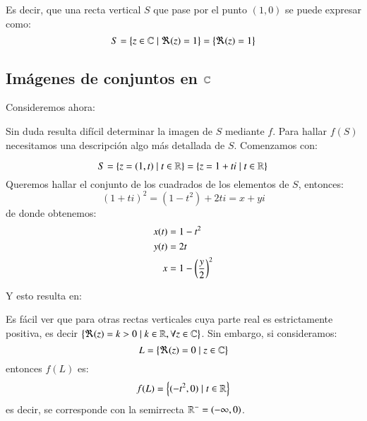     Es decir, que una recta vertical $S$ que pase por el punto $(1, 0)$ se puede expresar como:
    $$
        S = \left\{z \in \mathbb{C} \mid \Re(z) = 1\right\} = \left\{\Re(z) = 1\right\}
    $$

    \subsection{Im\'agenes de conjuntos en $\mathbb{C}$}

    Consideremos ahora:\\

    Sin duda resulta difícil determinar la imagen de $S$ mediante $f$. Para hallar $f(S)$ necesitamos una descripción algo más detallada de $S$. Comenzamos con:

    $$
        S = \left\{z=(1, t) \mid t \in \mathbb{R}\right\} = \left\{z = 1 + ti \mid t \in \mathbb{R}\right\}\\
    $$
    Queremos hallar el conjunto de los cuadrados de los elementos de $S$, entonces:
    $$
        (1+ti)^2 = (1-t^2)+2ti = x + yi
    $$
    de donde obtenemos:
    \begin{align*}
        x(t) &= 1-t^2\\
        y(t) &= 2t\\
        x &= 1-\left(\frac{y}{2}\right)^2
    \end{align*}

    Y esto resulta en:
    \begin{center}
    \end{center}

    Es fácil ver que para otras rectas verticales cuya parte real es estrictamente positiva, es decir $\left\{\Re(z)=k>0 \mid k\in \mathbb{R}, \forall z \in \mathbb{C}\right\}$. Sin embargo, si consideramos:
    $$
        L = \left\{\Re(z) = 0 \mid z\in\mathbb{C}\right\}
    $$
    entonces $f(L)$ es:
    $$
        f(L) = \left\{(-t^2, 0) \mid t \in \mathbb{R}\right\}
    $$
    es decir, se corresponde con la semirrecta $\mathbb{R}^{-} = (-\infty, 0)$.\\
    \begin{center}
    \end{center}

